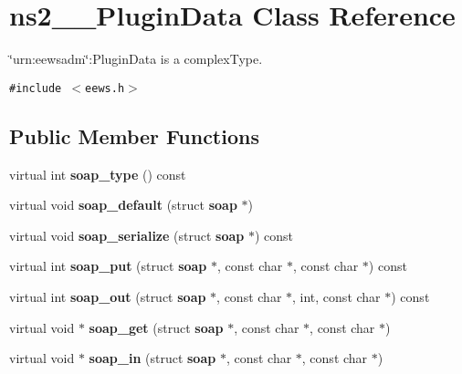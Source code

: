 \section{ns2\_\-\_\-PluginData Class Reference}
\label{classns2____PluginData}
\char`\"{}urn:eewsadm\char`\"{}:PluginData is a complexType.  


{\tt \#include $<$eews.h$>$}

\subsection*{Public Member Functions}
\begin{CompactItemize}
\item 
virtual int \textbf{soap\_\-type} () const \label{classns2____PluginData_488f1f35d009313eb72dc55c41ccd535}

\item 
virtual void \textbf{soap\_\-default} (struct {\bf soap} $\ast$)\label{classns2____PluginData_104ce0e9dc389eb049db39528ce9366a}

\item 
virtual void \textbf{soap\_\-serialize} (struct {\bf soap} $\ast$) const \label{classns2____PluginData_480c130d926c096a78c59989edfe80db}

\item 
virtual int \textbf{soap\_\-put} (struct {\bf soap} $\ast$, const char $\ast$, const char $\ast$) const \label{classns2____PluginData_6d031fecad47f1c36691e87252454261}

\item 
virtual int \textbf{soap\_\-out} (struct {\bf soap} $\ast$, const char $\ast$, int, const char $\ast$) const \label{classns2____PluginData_5d1cc95ce40e3876e00cd4166ff5ef77}

\item 
virtual void $\ast$ \textbf{soap\_\-get} (struct {\bf soap} $\ast$, const char $\ast$, const char $\ast$)\label{classns2____PluginData_8c624f9b96a624fac287a519e8dbbbac}

\item 
virtual void $\ast$ \textbf{soap\_\-in} (struct {\bf soap} $\ast$, const char $\ast$, const char $\ast$)\label{classns2____PluginData_406213bbbf6011c62953a15c029035cf}

\end{CompactItemize}
